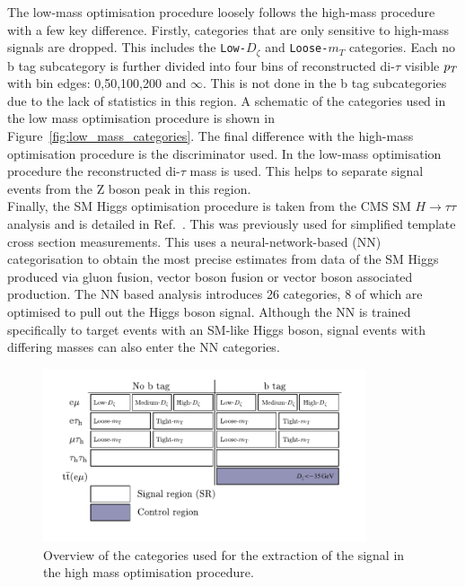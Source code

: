 The low-mass optimisation procedure loosely follows the high-mass procedure with a few key difference.
Firstly, categories that are only sensitive to high-mass signals are dropped.
This includes the \texttt{Low-$D_\zeta$} and \texttt{Loose-$m_{T}$} categories.
Each no b tag subcategory is further divided into four bins of reconstructed di-$\tau$ visible $p_{T}$ with bin edges: 0,50,100,200 and $\infty$.
This is not done in the b tag subcategories due to the lack of statistics in this region.
A schematic of the categories used in the low mass optimisation procedure is shown in Figure~\ref{fig:low_mass_categories}.
The final difference with the high-mass optimisation procedure is the discriminator used.
In the low-mass optimisation procedure the reconstructed di-$\tau$ mass is used.
This helps to separate signal events from the Z boson peak in this region. \\

Finally, the SM Higgs optimisation procedure is taken from the CMS SM $H \rightarrow \tau\tau$ analysis and is detailed in Ref.~\cite{CMS:2022kdi}.
This was previously used for simplified template cross section measurements.
This uses a neural-network-based (NN) categorisation to obtain the most precise estimates from data of the SM Higgs produced via gluon fusion, vector boson fusion or vector boson associated production.
The NN based analysis introduces 26 categories, 8 of which are optimised to pull out the Higgs boson signal.
Although the NN is trained specifically to target events with an SM-like Higgs boson, signal events with differing masses can also enter the NN categories.

\begin{figure}[!hbtp]
\centering
    \includegraphics[width=0.85\textwidth]{Figures/high_mass_categories.pdf}
\caption{Overview of the categories used for the extraction of the signal in the high mass optimisation procedure.}
\label{fig:high_mass_categories}
\end{figure}

